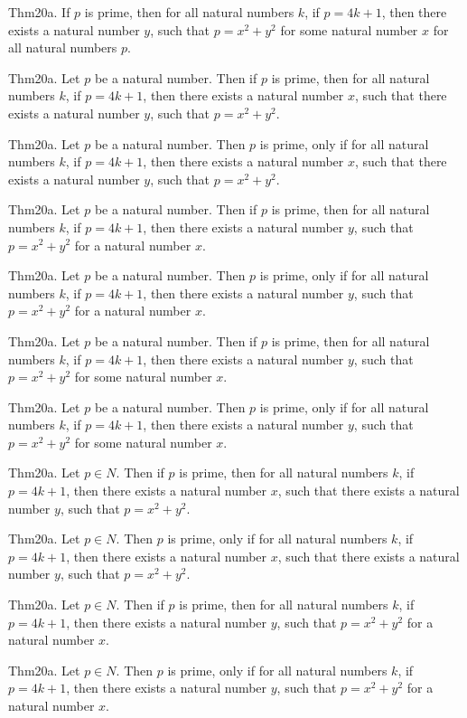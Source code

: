 \documentclass{article}
\begin{document}
Thm20a. If $p$ is prime, then for all natural numbers $k$, if $p = 4 k + 1$, then there exists a natural number $y$, such that $p = x ^{ 2}+ y ^{ 2}$ for some natural number $x$ for all natural numbers $p$.

Thm20a. Let $p$ be a natural number. Then if $p$ is prime, then for all natural numbers $k$, if $p = 4 k + 1$, then there exists a natural number $x$, such that there exists a natural number $y$, such that $p = x ^{ 2}+ y ^{ 2}$.

Thm20a. Let $p$ be a natural number. Then $p$ is prime, only if for all natural numbers $k$, if $p = 4 k + 1$, then there exists a natural number $x$, such that there exists a natural number $y$, such that $p = x ^{ 2}+ y ^{ 2}$.

Thm20a. Let $p$ be a natural number. Then if $p$ is prime, then for all natural numbers $k$, if $p = 4 k + 1$, then there exists a natural number $y$, such that $p = x ^{ 2}+ y ^{ 2}$ for a natural number $x$.

Thm20a. Let $p$ be a natural number. Then $p$ is prime, only if for all natural numbers $k$, if $p = 4 k + 1$, then there exists a natural number $y$, such that $p = x ^{ 2}+ y ^{ 2}$ for a natural number $x$.

Thm20a. Let $p$ be a natural number. Then if $p$ is prime, then for all natural numbers $k$, if $p = 4 k + 1$, then there exists a natural number $y$, such that $p = x ^{ 2}+ y ^{ 2}$ for some natural number $x$.

Thm20a. Let $p$ be a natural number. Then $p$ is prime, only if for all natural numbers $k$, if $p = 4 k + 1$, then there exists a natural number $y$, such that $p = x ^{ 2}+ y ^{ 2}$ for some natural number $x$.

Thm20a. Let $p \in N$. Then if $p$ is prime, then for all natural numbers $k$, if $p = 4 k + 1$, then there exists a natural number $x$, such that there exists a natural number $y$, such that $p = x ^{ 2}+ y ^{ 2}$.

Thm20a. Let $p \in N$. Then $p$ is prime, only if for all natural numbers $k$, if $p = 4 k + 1$, then there exists a natural number $x$, such that there exists a natural number $y$, such that $p = x ^{ 2}+ y ^{ 2}$.

Thm20a. Let $p \in N$. Then if $p$ is prime, then for all natural numbers $k$, if $p = 4 k + 1$, then there exists a natural number $y$, such that $p = x ^{ 2}+ y ^{ 2}$ for a natural number $x$.

Thm20a. Let $p \in N$. Then $p$ is prime, only if for all natural numbers $k$, if $p = 4 k + 1$, then there exists a natural number $y$, such that $p = x ^{ 2}+ y ^{ 2}$ for a natural number $x$.
\end{document}
